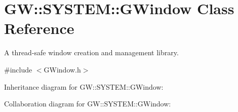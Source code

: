 \hypertarget{classGW_1_1SYSTEM_1_1GWindow}{}\section{GW\+:\+:S\+Y\+S\+T\+EM\+:\+:G\+Window Class Reference}
\label{classGW_1_1SYSTEM_1_1GWindow}


A thread-\/safe window creation and management library.  




{\ttfamily \#include $<$G\+Window.\+h$>$}



Inheritance diagram for GW\+:\+:S\+Y\+S\+T\+EM\+:\+:G\+Window\+:


Collaboration diagram for GW\+:\+:S\+Y\+S\+T\+EM\+:\+:G\+Window\+:
